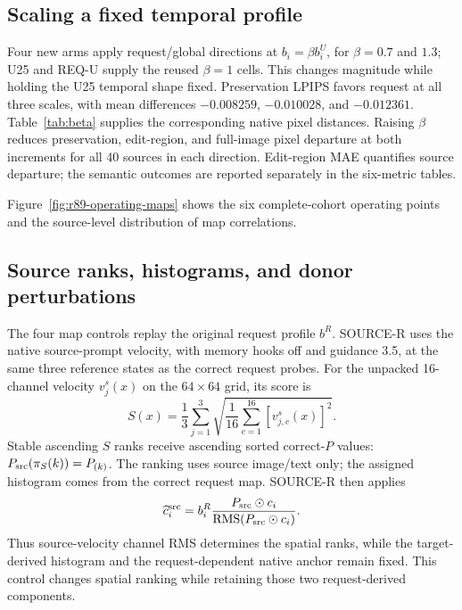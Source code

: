 \documentclass[10pt,doubleanonymous]{ieeeconf}
\newcommand{\RMS}{\operatorname{RMS}}
\begin{document}
\subsection{Scaling a fixed temporal profile}
Four new arms apply request/global directions at $b_i=\beta b_i^U$, for $\beta=0.7$ and $1.3$; U25 and REQ-U supply the reused $\beta=1$ cells. This changes magnitude while holding the U25 temporal shape fixed. Preservation LPIPS favors request at all three scales, with mean differences $-0.008259$, $-0.010028$, and $-0.012361$. Table~\ref{tab:beta} supplies the corresponding native pixel distances. Raising $\beta$ reduces preservation, edit-region, and full-image pixel departure at both increments for all 40 sources in each direction. Edit-region MAE quantifies source departure; the semantic outcomes are reported separately in the six-metric tables.



Figure~\ref{fig:r89-operating-maps} shows the six complete-cohort operating points and the source-level distribution of map correlations.


\subsection{Source ranks, histograms, and donor perturbations}
The four map controls replay the original request profile $b^R$. SOURCE-R uses the native source-prompt velocity, with memory hooks off and guidance 3.5, at the same three reference states as the correct request probes. For the unpacked 16-channel velocity $v_j^s(x)$ on the $64\times64$ grid, its score is
\begin{equation}
S(x)=\frac{1}{3}\sum_{j=1}^{3}\sqrt{\frac{1}{16}\sum_{c=1}^{16}[v_{j,c}^s(x)]^2}.
\end{equation}
Stable ascending $S$ ranks receive ascending sorted correct-$P$ values: $P_{\rm src}(\pi_S(k))=P_{(k)}$. The ranking uses source image/text only; the assigned histogram comes from the correct request map. SOURCE-R then applies
\begin{equation}
\widehat c_i^{\rm src}=b_i^R\frac{P_{\rm src}\odot c_i}{\RMS(P_{\rm src}\odot c_i)}.
\end{equation}
Thus source-velocity channel RMS determines the spatial ranks, while the target-derived histogram and the request-dependent native anchor remain fixed. This control changes spatial ranking while retaining those two request-derived components.
\end{document}
